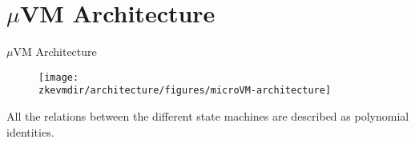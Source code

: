
\section{$\mu$VM Architecture}

\begin{frame}{$\mu$VM Architecture}
\begin{figure}
\texttt{[image: \\zkevmdir/architecture/figures/microVM-architecture]}
\end{figure}
All the relations between the different state machines are described as polynomial identities.
\end{frame}